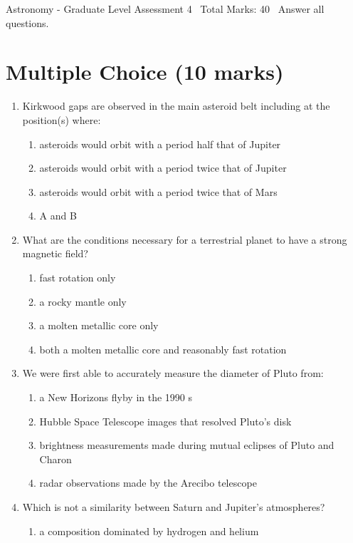 \documentclass[12pt]{article}
\begin{document}
\begin{center}
Astronomy - Graduate Level Assessment 4 \
Total Marks: 40 \
Answer all questions.
\end{center}

\section*{Multiple Choice (10 marks)}
\begin{enumerate}[label=\arabic*.]
\item Kirkwood gaps are observed in the main asteroid belt including at the position(s) where:
\begin{enumerate}[label=(\alph*)]
    \item asteroids would orbit with a period half that of Jupiter
    \item asteroids would orbit with a period twice that of Jupiter
    \item asteroids would orbit with a period twice that of Mars
    \item A and B
\end{enumerate}
\item What are the conditions necessary for a terrestrial planet to have a strong magnetic field?
\begin{enumerate}[label=(\alph*)]
    \item fast rotation only
    \item a rocky mantle only
    \item a molten metallic core only
    \item both a molten metallic core and reasonably fast rotation
\end{enumerate}
\item We were first able to accurately measure the diameter of Pluto from:
\begin{enumerate}[label=(\alph*)]
    \item a New Horizons flyby in the 1990 s
    \item Hubble Space Telescope images that resolved Pluto's disk
    \item brightness measurements made during mutual eclipses of Pluto and Charon
    \item radar observations made by the Arecibo telescope
\end{enumerate}
\item Which is not a similarity between Saturn and Jupiter's atmospheres?
\begin{enumerate}[label=(\alph*)]
    \item a composition dominated by hydrogen and helium

\end{enumerate}
\end{enumerate}
\end{document}
